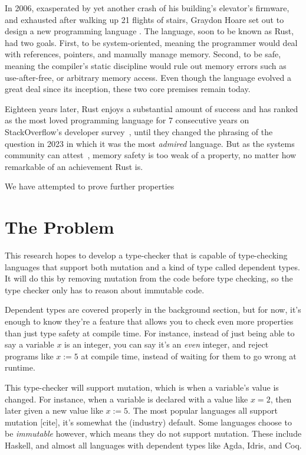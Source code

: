\documentclass[12pt,twoside]{report}
\begin{document}
In 2006, exasperated by yet another crash of his building's elevator's firmware, and exhausted after walking up 21 flights of stairs, Graydon Hoare set out to design a new programming language \citep{rust-anecdote}. The language, soon to be known as Rust, had two goals. First, to be system-oriented, meaning the programmer would deal with references, pointers, and manually manage memory. Second, to be safe, meaning the compiler's static discipline would rule out memory errors such as use-after-free, or arbitrary memory access. Even though the language evolved a great deal since its inception, these two core premises remain today. 

Eighteen years later, Rust enjoys a substantial amount of success and has ranked as the most loved programming language for 7 consecutive years on StackOverflow's developer survey~\citep{stackoverflow}, until they changed the phrasing of the question in 2023 in which it was the most \textit{admired} language. But as the systems community can attest~\citep{klein2009sel4,lorch2020armada,ferraiuolo2017komodo,bhargavan2017everest}, memory safety is too weak of a property, no matter how remarkable of an achievement Rust is.

We have attempted to prove further properties 

\section{The Problem}
This research hopes to develop a type-checker that is capable of type-checking languages that support both mutation and a kind of type called dependent types. It will do this by removing mutation from the code before type checking, so the type checker only has to reason about immutable code.

Dependent types are covered properly in the background section, but for now, it's enough to know they're a feature that allows you to check even more properties than just type safety at compile time. For instance, instead of just being able to say a variable $x$ is an integer, you can say it's an \textit{even} integer, and reject programs like $x := 5$ at compile time, instead of waiting for them to go wrong at runtime.

This type-checker will support mutation, which is when a variable's value is changed. For instance, when a variable is declared with a value like $x = 2$, then later given a new value like $x := 5$. The most popular languages all support mutation [cite], it's somewhat the (industry) default. Some languages choose to be \textit{immutable} however, which means they do not support mutation. These include Haskell, and almost all languages with dependent types like Agda, Idris, and Coq.
\end{document}
